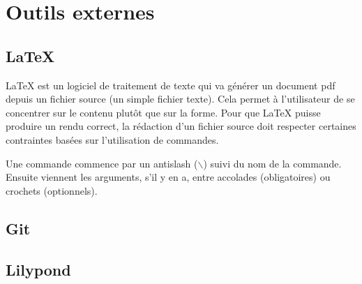 \chapter{Outils externes}
\setcounter{chapter}{3}
\label{chap:outils-externes}
\minitoc

\section{\LaTeX{}}

\LaTeX{} est un logiciel de traitement de texte qui va générer un
document pdf depuis un fichier source (un simple fichier texte). Cela
permet à l'utilisateur de se concentrer sur le contenu plutôt que sur
la forme. Pour que \LaTeX{} puisse produire un rendu correct, la
rédaction d'un fichier source doit respecter certaines contraintes
basées sur l'utilisation de commandes.

Une commande commence par un antislash ($\backslash$) suivi du nom de
la commande. Ensuite viennent les arguments, s'il y en a, entre
accolades (obligatoires) ou crochets (optionnels).


\section{Git}






\section{Lilypond}


